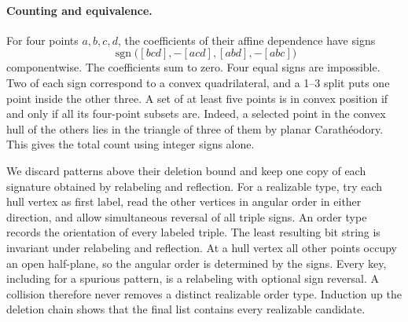 \documentclass[11pt]{article}
\begin{document}
\paragraph{Counting and equivalence.} For four points $a,b,c,d$, the coefficients of their affine dependence have signs
\[
 \operatorname{sgn}\bigl([bcd],-[acd],[abd],-[abc]\bigr)
\]
componentwise. The coefficients sum to zero. Four equal signs are impossible. Two of each sign correspond to a convex quadrilateral, and a 1--3 split puts one point inside the other three. A set of at least five points is in convex position if and only if all its four-point subsets are. Indeed, a selected point in the convex hull of the others lies in the triangle of three of them by planar Carath\'eodory. This gives the total count using integer signs alone.

We discard patterns above their deletion bound and keep one copy of each signature obtained by relabeling and reflection. For a realizable type, try each hull vertex as first label, read the other vertices in angular order in either direction, and allow simultaneous reversal of all triple signs. An order type records the orientation of every labeled triple. The least resulting bit string is invariant under relabeling and reflection. At a hull vertex all other points occupy an open half-plane, so the angular order is determined by the signs. Every key, including for a spurious pattern, is a relabeling with optional sign reversal. A collision therefore never removes a distinct realizable order type. Induction up the deletion chain shows that the final list contains every realizable candidate.

\newpage
\end{document}
